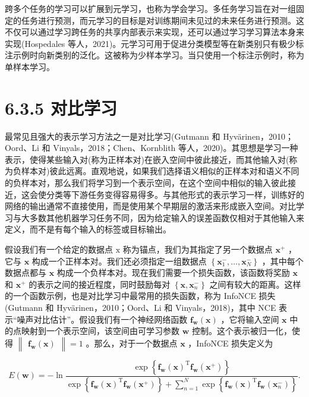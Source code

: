 \documentclass[10pt]{report}
\begin{document}
跨多个任务的学习可以扩展到元学习，也称为学会学习。多任务学习旨在对一组固定的任务进行预测，而元学习的目标是对训练期间未见过的未来任务进行预测。这不仅可以通过学习跨任务的共享内部表示来实现，还可以通过学习学习算法本身来实现(Hospedales 等人，2021)。元学习可用于促进分类模型等在新类别只有极少标注示例时向新类别的泛化。这被称为少样本学习。当只使用一个标注示例时，称为单样本学习。

\section*{6.3.5 对比学习}

最常见且强大的表示学习方法之一是对比学习(Gutmann 和 Hyvärinen，2010；Oord、Li 和 Vinyals，2018；Chen、Kornblith 等人，2020)。其思想是学习一种表示，使得某些输入对(称为正样本对)在嵌入空间中彼此接近，而其他输入对(称为负样本对)彼此远离。直观地说，如果我们选择语义相似的正样本对和语义不同的负样本对，那么我们将学习到一个表示空间，在这个空间中相似的输入彼此接近，这会使分类等下游任务变得容易得多。与其他形式的表示学习一样，训练好的网络的输出通常不直接使用，而是使用某个早期层的激活来形成嵌入空间。对比学习与大多数其他机器学习任务不同，因为给定输入的误差函数仅相对于其他输入来定义，而不是有每个输入的标签或目标输出。

假设我们有一个给定的数据点 \(\mathrm{x}\) 称为锚点，我们为其指定了另一个数据点 \({\mathbf{x}}^{ + }\) ，它与 \(\mathbf{x}\) 构成一个正样本对。我们还必须指定一组数据点 \(\left\{  {{\mathbf{x}}_{1}^{ - },\ldots ,{\mathbf{x}}_{N}^{ - }}\right\}\) ，其中每个数据点都与 \(\mathbf{x}\) 构成一个负样本对。现在我们需要一个损失函数，该函数将奖励 \(\mathbf{x}\) 和 \({\mathbf{x}}^{ + }\) 的表示之间的接近程度，同时鼓励每对 \(\left\{  {\mathbf{x},{\mathbf{x}}_{n}^{ - }}\right\}\) 之间有较大的距离。这样的一个函数示例，也是对比学习中最常用的损失函数，称为 InfoNCE 损失(Gutmann 和 Hyvärinen，2010；Oord、Li 和 Vinyals，2018)，其中 NCE 表示“噪声对比估计”。假设我们有一个神经网络函数 \({\mathbf{f}}_{\mathbf{w}}\left( \mathbf{x}\right)\) ，它将输入空间 \(\mathbf{x}\) 中的点映射到一个表示空间，该空间由可学习参数 \(\mathbf{w}\) 控制。这个表示被归一化，使得 \(\begin{Vmatrix}{{\mathbf{f}}_{\mathbf{w}}\left( \mathbf{x}\right) }\end{Vmatrix} = 1\) 。那么，对于一个数据点 \(\mathbf{x}\) ，InfoNCE 损失定义为

\[
E\left( \mathbf{w}\right)  =  - \ln \frac{\exp \left\{  {{\mathbf{f}}_{\mathbf{w}}{\left( \mathbf{x}\right) }^{\mathrm{T}}{\mathbf{f}}_{\mathbf{w}}\left( {\mathbf{x}}^{ + }\right) }\right\}  }{\exp \left\{  {{\mathbf{f}}_{\mathbf{w}}{\left( \mathbf{x}\right) }^{\mathrm{T}}{\mathbf{f}}_{\mathbf{w}}\left( {\mathbf{x}}^{ + }\right) }\right\}   + \mathop{\sum }\limits_{{n = 1}}^{N}\exp \left\{  {{\mathbf{f}}_{\mathbf{w}}{\left( \mathbf{x}\right) }^{\mathrm{T}}{\mathbf{f}}_{\mathbf{w}}\left( {\mathbf{x}}_{n}^{ - }\right) }\right\}  }. \tag{6.20}
\]
\end{document}
